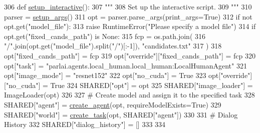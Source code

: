 \begin{DoxyCode}
306 \textcolor{keyword}{def }\hyperlink{namespaceprojects_1_1personality__captions_1_1interactive_aa5144adf4092cfa1c2dc076d766226a1}{setup\_interactive}():
307     \textcolor{stringliteral}{"""}
308 \textcolor{stringliteral}{    Set up the interactive script.}
309 \textcolor{stringliteral}{    """}
310     parser = \hyperlink{namespaceprojects_1_1self__feeding_1_1interactive_a2ad3b874d9caef6e76ea41e029b933f0}{setup\_args}()
311     opt = parser.parse\_args(print\_args=\textcolor{keyword}{True})
312     \textcolor{keywordflow}{if} \textcolor{keywordflow}{not} opt.get(\textcolor{stringliteral}{"model\_file"}):
313         \textcolor{keywordflow}{raise} RuntimeError(\textcolor{stringliteral}{"Please specify a model file"})
314     \textcolor{keywordflow}{if} opt.get(\textcolor{stringliteral}{"fixed\_cands\_path"}) \textcolor{keywordflow}{is} \textcolor{keywordtype}{None}:
315         fcp = os.path.join(
316             \textcolor{stringliteral}{"/"}.join(opt.get(\textcolor{stringliteral}{"model\_file"}).split(\textcolor{stringliteral}{"/"})[:-1]), \textcolor{stringliteral}{"candidates.txt"}
317         )
318         opt[\textcolor{stringliteral}{"fixed\_cands\_path"}] = fcp
319         opt[\textcolor{stringliteral}{"override"}][\textcolor{stringliteral}{"fixed\_cands\_path"}] = fcp
320     opt[\textcolor{stringliteral}{"task"}] = \textcolor{stringliteral}{"parlai.agents.local\_human.local\_human:LocalHumanAgent"}
321     opt[\textcolor{stringliteral}{"image\_mode"}] = \textcolor{stringliteral}{"resnet152"}
322     opt[\textcolor{stringliteral}{"no\_cuda"}] = \textcolor{keyword}{True}
323     opt[\textcolor{stringliteral}{"override"}][\textcolor{stringliteral}{"no\_cuda"}] = \textcolor{keyword}{True}
324     SHARED[\textcolor{stringliteral}{"opt"}] = opt
325     SHARED[\textcolor{stringliteral}{"image\_loader"}] = ImageLoader(opt)
326 
327     \textcolor{comment}{# Create model and assign it to the specified task}
328     SHARED[\textcolor{stringliteral}{"agent"}] = \hyperlink{namespaceparlai_1_1core_1_1agents_a00d77a7e26fb89e8bd900f7b2a02982a}{create\_agent}(opt, requireModelExists=\textcolor{keyword}{True})
329     SHARED[\textcolor{stringliteral}{"world"}] = \hyperlink{namespaceparlai_1_1core_1_1worlds_a79969c7ba76d4b3c500f5bb776444dc6}{create\_task}(opt, SHARED[\textcolor{stringliteral}{"agent"}])
330 
331     \textcolor{comment}{# Dialog History}
332     SHARED[\textcolor{stringliteral}{"dialog\_history"}] = []
333 
334 
\end{DoxyCode}


